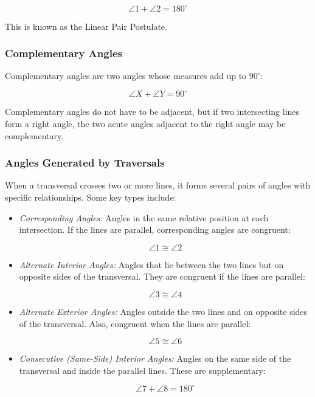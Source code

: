\[
	\angle 1 + \angle 2 = 180^\circ
\]

This is known as the Linear Pair Postulate.

\subsubsection{Complementary Angles}

Complementary angles are two angles whose measures add up to \(90^\circ\):

\[
	\angle X + \angle Y = 90^\circ
\]

Complementary angles do not have to be adjacent, but if two intersecting lines form a right angle, the 
two acute angles adjacent to the right angle may be complementary.

\subsubsection{Angles Generated by Traversals}

When a transversal crosses two or more lines, it forms several pairs of angles with specific 
relationships. Some key types include:

\begin{itemize}

	\item \emph{Corresponding Angles:} Angles in the same relative position at each intersection. If the 
	lines are parallel, corresponding angles are congruent:
	 
		\[
 		   \angle 1 \cong \angle 2
   		\]
    
    \item \emph{Alternate Interior Angles:} Angles that lie between the two lines but on opposite sides 
	of the transversal. They are congruent if the lines are parallel:
    
		\[
  		  \angle 3 \cong \angle 4
    	\]
    
    \item \emph{Alternate Exterior Angles:} Angles outside the two lines and on opposite sides of the 
	transversal. Also, congruent when the lines are parallel:
    
		\[
 		   \angle 5 \cong \angle 6
    	\]
    
    \item \emph{Consecutive (Same-Side) Interior Angles:} Angles on the same side of the transversal and 
	inside the parallel lines. These are supplementary:
    
		  \[
 	   			\angle 7 + \angle 8 = 180^\circ
   	      \]
\end{itemize}

